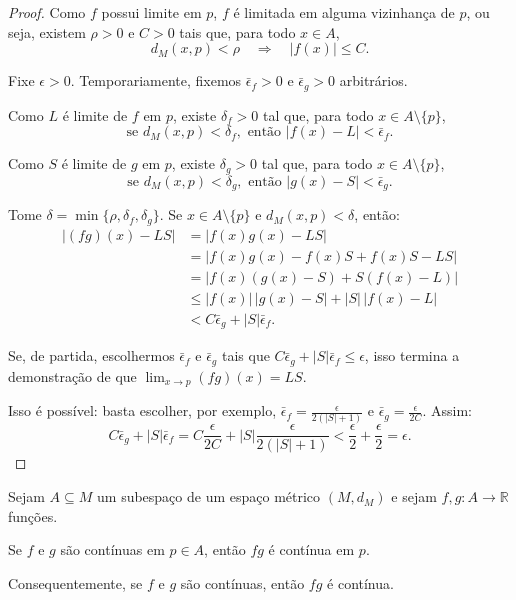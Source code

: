 \begin{proof}
    Como $f$ possui limite em $p$, $f$ é limitada em alguma vizinhança de $p$, ou seja, existem $\rho>0$ e $C>0$ tais que, para todo $x\in A$,
    \[
        d_M(x,p)<\rho
        \quad\Longrightarrow\quad
        |f(x)|\leq C.
    \]

    Fixe $\epsilon>0$.
    Temporariamente, fixemos $\bar \epsilon_f>0$ e $\bar \epsilon_g>0$ arbitrários.

    Como $L$ é limite de $f$ em $p$, existe $\delta_f>0$ tal que, para todo $x\in A\setminus\{p\}$,
    \[
        \text{se }d_M(x,p)<\delta_f,\text{ então } |f(x)-L|<\bar \epsilon_f.
    \]

    Como $S$ é limite de $g$ em $p$, existe $\delta_g>0$ tal que, para todo $x\in A\setminus\{p\}$,
    \[
        \text{se }d_M(x,p)<\delta_g,\text{ então } |g(x)-S|<\bar \epsilon_g.
    \]

    Tome $\delta=\min\{\rho,\delta_f,\delta_g\}$.
    Se $x\in A\setminus\{p\}$ e $d_M(x,p)<\delta$, então:
    \begin{align*}
        |(fg)(x)-LS|
        &=
        |f(x)g(x)-LS|\\
        &=
        |f(x)g(x)-f(x)S+f(x)S-LS|\\
        &=
        |f(x)(g(x)-S)+S(f(x)-L)|\\
        &\leq
        |f(x)|\,|g(x)-S|+|S|\,|f(x)-L|\\
        &<
        C\bar \epsilon_g
        +
        |S|\bar \epsilon_f
        .
    \end{align*}

    Se, de partida, escolhermos $\bar \epsilon_f$ e $\bar \epsilon_g$ tais que $C\bar \epsilon_g+|S|\bar \epsilon_f\leq\epsilon$, isso termina a demonstração de que $\lim_{x\to p}(fg)(x)=LS$.

    Isso é possível: basta escolher, por exemplo, $\bar \epsilon_f=\frac{\epsilon}{2(|S|+1)}$ e $\bar \epsilon_g=\frac{\epsilon}{2C}$.
    Assim:
    \[
        C\bar \epsilon_g+|S|\bar \epsilon_f
        =
        C\frac{\epsilon}{2C}+|S|\frac{\epsilon}{2(|S|+1)}
        <
        \frac{\epsilon}{2}+\frac{\epsilon}{2}
        =
        \epsilon.
    \]
\end{proof}

\begin{corollary}
    Sejam $A\subseteq M$ um subespaço de um espaço métrico $(M,d_M)$ e sejam $f,g:A\to\mathbb R$ funções.

    Se $f$ e $g$ são contínuas em $p\in A$, então $fg$ é contínua em $p$.

    Consequentemente, se $f$ e $g$ são contínuas, então $fg$ é contínua.
\end{corollary}

